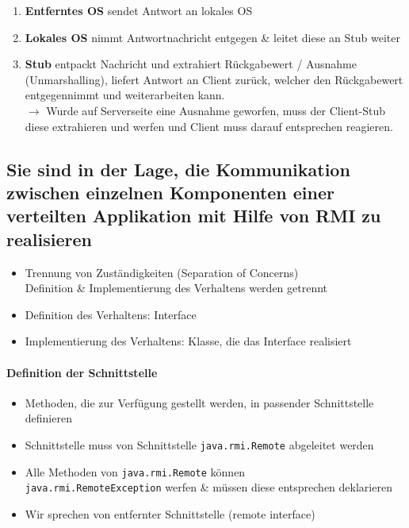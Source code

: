 \documentclass[a4paper]{article}
\begin{document}
\begin{enumerate}[itemsep=0.5em]
				\item \textbf{Entferntes OS} sendet Antwort an lokales OS
				
				\item \textbf{Lokales OS} nimmt Antwortnachricht entgegen \& leitet diese an Stub weiter
				
				\item \textbf{Stub} entpackt Nachricht und extrahiert Rückgabewert / Ausnahme (Unmarshalling), liefert Antwort an Client zurück, welcher den Rückgabewert entgegennimmt und weiterarbeiten kann.\\
				$\rightarrow$ Wurde auf Serverseite eine Ausnahme geworfen, muss der Client-Stub diese extrahieren und werfen und Client muss darauf entsprechen reagieren.
			\end{enumerate}
		
		\newpage
		
		\subsection{Sie sind in der Lage, die Kommunikation zwischen einzelnen Komponenten einer verteilten Applikation mit Hilfe von RMI zu realisieren}
		
		\begin{itemize}
			\item Trennung von Zuständigkeiten (Separation of Concerns)\\
			Definition \& Implementierung des Verhaltens werden getrennt
			\item Definition des Verhaltens: Interface
			\item Implementierung des Verhaltens: Klasse, die das Interface realisiert
		\end{itemize}
	
				\paragraph{Definition der Schnittstelle}
				
					\begin{itemize}
						\item Methoden, die zur Verfügung gestellt werden, in passender Schnittstelle definieren
						\item Schnittstelle muss von Schnittstelle \texttt{java.rmi.Remote} abgeleitet werden
						\item Alle Methoden von \texttt{java.rmi.Remote} können\\
							\texttt{java.rmi.RemoteException} werfen \& müssen diese entsprechen deklarieren
						\item Wir sprechen von entfernter Schnittstelle (remote interface)
					\end{itemize}
				
\end{document}
